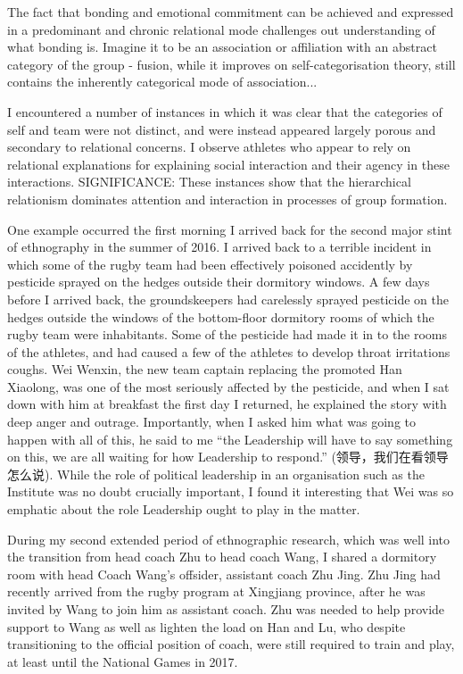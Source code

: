 \begin{CJK}{UTF8}{gbsn}
The fact that bonding and emotional commitment can be achieved and expressed in a predominant and chronic relational mode challenges out understanding of what bonding is.  Imagine it to be an association or affiliation with an abstract category of the group - fusion, while it improves on self-categorisation theory, still contains the inherently categorical mode of association...



I encountered a number of instances in which it was clear that the categories of self and team were not distinct, and were instead appeared largely porous and secondary to relational concerns. I observe athletes who appear to rely on relational explanations for explaining social interaction and their agency in these interactions.
SIGNIFICANCE:  These instances show that the hierarchical relationism dominates attention and interaction in processes of group formation.

One example occurred the first morning I arrived back for the second major stint of ethnography in the summer of 2016. I arrived back to a terrible incident in which some of the rugby team had been effectively poisoned accidently by pesticide sprayed on the hedges outside their dormitory windows.  A few days before I arrived back, the groundskeepers had carelessly sprayed pesticide on the hedges outside the windows of the bottom-floor dormitory rooms of which the rugby team were inhabitants.  Some of the pesticide had made it in to the rooms of the athletes, and had caused a few of the athletes to develop throat irritations coughs.  Wei Wenxin, the new team captain replacing the promoted Han Xiaolong, was one of the most seriously affected by the pesticide, and when I sat down with him at breakfast the first day I returned, he explained the story with deep anger and outrage.  Importantly, when I asked him what was going to happen with all of this, he said to me ``the Leadership will have to say something on this, we are all waiting for how Leadership to respond.'' (领导，我们在看领导怎么说). While the role of political leadership in an organisation such as the Institute was no doubt crucially important, I found it interesting that Wei was so emphatic about the role Leadership ought to play in the matter.

During my second extended period of ethnographic research, which was well into the transition from head coach Zhu to head coach Wang, I shared a dormitory room with head Coach Wang's offsider, assistant coach Zhu Jing.  Zhu Jing had recently arrived from the rugby program at Xingjiang province, after he was invited by Wang to join him as assistant coach.  Zhu was needed to help provide support to Wang as well as lighten the load on Han and Lu, who despite transitioning to the official position of coach, were still required to train and play, at least until the National Games in 2017.


\end{CJK}
